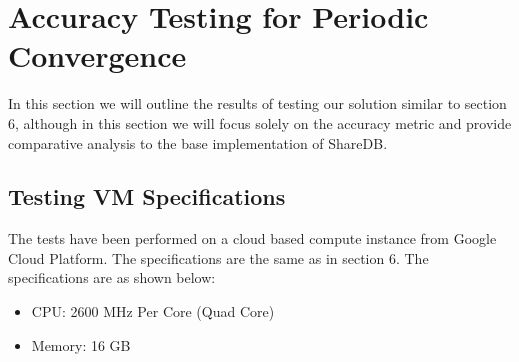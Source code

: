 \documentclass[9pt, titlepage]{article}
\begin{document}
  \break

  \section{Accuracy Testing for Periodic Convergence}
  In this section we will outline the results of testing our solution similar to section 6, although in this section we will focus
  solely on the accuracy metric and provide comparative analysis to the base implementation of ShareDB. 

  \subsection{Testing VM Specifications}
  The tests have been performed on a cloud based compute instance from Google Cloud Platform. The specifications are the same as in section 6.
  The specifications are as shown below:
  \begin{itemize}
    \item CPU: 2600 MHz Per Core (Quad Core)
    \item Memory: 16 GB
  \end{itemize}
\end{document}
